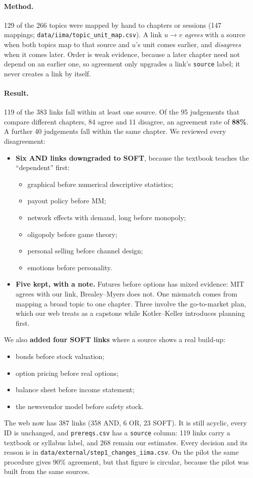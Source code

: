 \documentclass[11pt,a4paper]{article}
\begin{document}
\paragraph{Method.} 129 of the 266 topics were mapped by hand to chapters or sessions (147 mappings; \texttt{data/iima/topic\_unit\_map.csv}). A link $u\to v$ \emph{agrees} with a source when both topics map to that source and $u$'s unit comes earlier, and \emph{disagrees} when it comes later. Order is weak evidence, because a later chapter need not depend on an earlier one, so agreement only upgrades a link's \texttt{source} label; it never creates a link by itself.

\paragraph{Result.} 119 of the 383 links fall within at least one source. Of the 95 judgements that compare different chapters, 84 agree and 11 disagree, an agreement rate of \textbf{88\%}. A further 40 judgements fall within the same chapter. We reviewed every disagreement:
\begin{itemize}
\item \textbf{Six AND links downgraded to SOFT}, because the textbook teaches the ``dependent'' first:
  \begin{itemize}
  \item graphical before numerical descriptive statistics;
  \item payout policy before MM;
  \item network effects with demand, long before monopoly;
  \item oligopoly before game theory;
  \item personal selling before channel design;
  \item emotions before personality.
  \end{itemize}
\item \textbf{Five kept, with a note.} Futures before options has mixed evidence: MIT agrees with our link, Brealey--Myers does not. One mismatch comes from mapping a broad topic to one chapter. Three involve the go-to-market plan, which our web treats as a capstone while Kotler--Keller introduces planning first.
\end{itemize}
We also \textbf{added four SOFT links} where a source shows a real build-up:
\begin{itemize}
\item bonds before stock valuation;
\item option pricing before real options;
\item balance sheet before income statement;
\item the newsvendor model before safety stock.
\end{itemize}
The web now has 387 links (358 AND, 6 OR, 23 SOFT). It is still acyclic, every ID is unchanged, and \texttt{prereqs.csv} has a \texttt{source} column: 119 links carry a textbook or syllabus label, and 268 remain our estimates. Every decision and its reason is in \texttt{data/external/step1\_changes\_iima.csv}. On the pilot the same procedure gives 90\% agreement, but that figure is circular, because the pilot was built from the same sources.
\end{document}
